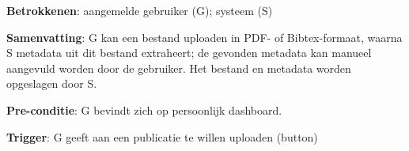 \noindent \textbf{Betrokkenen}: aangemelde gebruiker (G); systeem (S) 
\vspace{2 mm}

\noindent \textbf{Samenvatting}: G kan een bestand uploaden in PDF- of Bibtex-formaat, waarna S metadata uit dit bestand extraheert; de gevonden metadata kan manueel aangevuld worden door de gebruiker. Het bestand en metadata worden opgeslagen door S. 
\vspace{2 mm}

\noindent \textbf{Pre-conditie}: G bevindt zich op persoonlijk dashboard.  
\vspace{2 mm}

\noindent \textbf{Trigger}: G geeft aan een publicatie te willen uploaden (button)
\vspace{4 mm}



